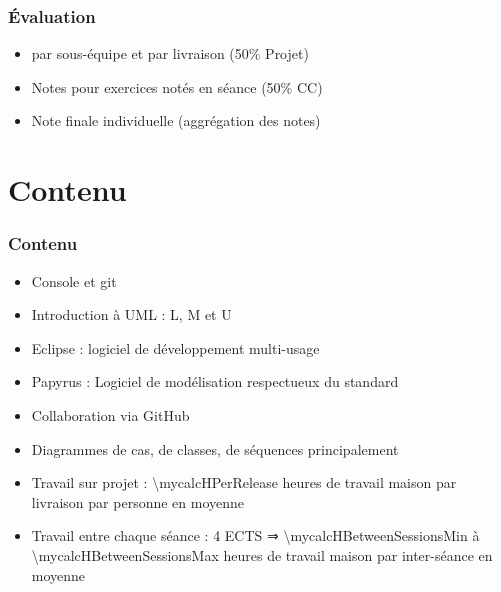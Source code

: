 \documentclass[french]{beamer}
\begin{document}
\begin{frame}
	\frametitle{Évaluation}
	\begin{itemize}
		\item {} par sous-équipe et par livraison (50\% Projet)
		\item Notes pour exercices notés en séance (50\% CC)
		\item Note finale individuelle (aggrégation des notes)
	\end{itemize}
\end{frame}

\section{Contenu}
\begin{frame}
	\frametitle{Contenu}
	\begin{itemize}
		\item Console et git
		\item Introduction à UML : L, M et U
		\item Eclipse : logiciel de développement multi-usage
		\item Papyrus : Logiciel de modélisation respectueux du standard
		\item Collaboration via GitHub
		\item Diagrammes de cas, de classes, de séquences principalement
		\item Travail sur projet : \num{\mycalcHPerRelease} heures de travail maison par livraison par personne en moyenne
		\item Travail entre chaque séance : 4 ECTS ⇒ \num[round-mode=places, round-precision=1, mode=text]{\mycalcHBetweenSessionsMin} à \num[round-mode=places, round-precision=1, mode=text]{\mycalcHBetweenSessionsMax} heures de travail maison par inter-séance en moyenne
	\end{itemize}
\end{frame}
\end{document}
